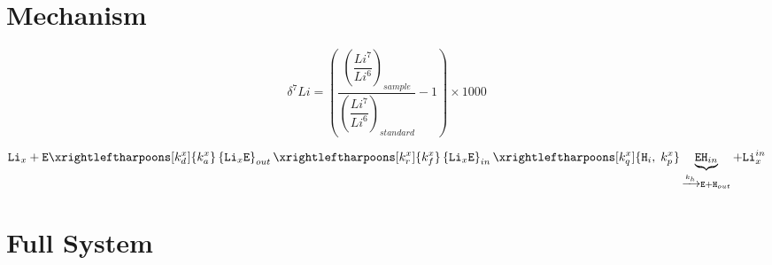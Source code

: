 \documentclass[aps,onecolumn,11pt]{revtex4}
\newcommand{\mychem}[1]{\mathtt{#1}}
\begin{document}
\section{Mechanism}

$$
	\delta^7Li = \left(
		\dfrac{\left(\dfrac{Li^7}{Li^6}\right)_{sample}}
		{\left(\dfrac{Li^7}{Li^6}\right)_{standard}}
		 -1 
	\right) \times 1000
$$

\begin{equation}
	 \mychem{Li}_{x} +  \mychem{E}  
	 \xrightleftharpoons[k_d^x]{k_a^x} 
	 \left\lbrace\mychem{Li}_{x}\mychem{E}\right\rbrace_{out} 
	  \xrightleftharpoons[k_r^x]{k_f^x} 
	  \left\lbrace\mychem{Li}_{x}\mychem{E}\right\rbrace_{in}  
	  \xrightleftharpoons[k_q^x]{\mychem{H}_i,\;k_p^x} \underbrace{\mychem{EH}_{in}}_{\xrightarrow[]{k_h} \mychem{E} + \mychem{H}_{out}} + \mychem{Li}_{x}^{in}
\end{equation}

\section{Full System}
\end{document}
